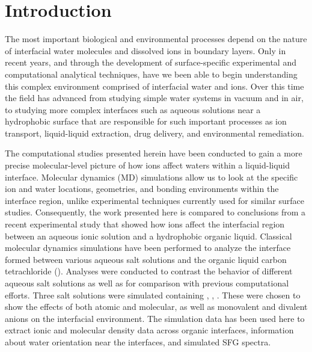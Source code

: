 \section{Introduction}

The most important biological and environmental processes depend on the nature of interfacial water molecules and dissolved ions in boundary layers. Only in recent years, and through the development of surface-specific experimental\cite{Charreteur2008,Chen2007,Luo2006} and computational\cite{Schnell2004,Wardle2005,Wick2008a} analytical techniques, have we been able to begin understanding this complex environment comprised of interfacial water and ions. Over this time the field has advanced from studying simple water systems in vacuum and in air, to studying more complex interfaces such as aqueous solutions near a hydrophobic surface that are responsible for such important processes as ion transport, liquid-liquid extraction, drug delivery, and environmental remediation. 

The computational studies presented herein have been conducted to gain a more precise molecular-level picture of how ions affect waters within a liquid-liquid interface. Molecular dynamics (MD) simulations allow us to look at the specific ion and water locations, geometries, and bonding environments within the interface region, unlike experimental techniques currently used for similar surface studies. Consequently, the work presented here is compared to conclusions from a recent experimental study that showed how ions affect the interfacial region between an aqueous ionic solution and a hydrophobic organic liquid.\cite{McFearin2009} Classical molecular dynamics simulations have been performed to analyze the interface formed between various aqueous salt solutions and the organic liquid carbon tetrachloride (\ctc). Analyses were conducted to contrast the behavior of different aqueous salt solutions as well as for comparison with previous computational efforts.\cite{Hore2007,Hore2008,Hore2007a,Walker2006b,Walker2007a,Walker2007b}  Three salt solutions were simulated containing \nacl, \sodnit, \sodsul. These were chosen to show the effects of both atomic and molecular, as well as monovalent and divalent anions on the interfacial environment. The simulation data has been used here to extract ionic and molecular density data across organic interfaces, information about water orientation near the interfaces, and simulated SFG spectra. 


